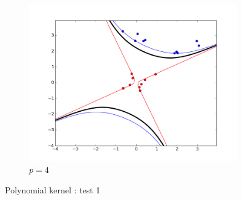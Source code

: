 \documentclass{article}
\begin{document}
\begin{figure}[!h]
\begin{subfigure}[b]{0.3\textwidth}
    \end{subfigure}
     ~ 
    \begin{subfigure}[b]{0.3\textwidth}
        \includegraphics[width=1.2\textwidth]{images/pol/1/figure_4.png}
        \caption{$p = 4$}  \label{polynomial_1_figure_3}
    \end{subfigure}
    \caption{Polynomial kernel : test 1}
    \label{polynomial_1}
\end{figure}
\end{document}
